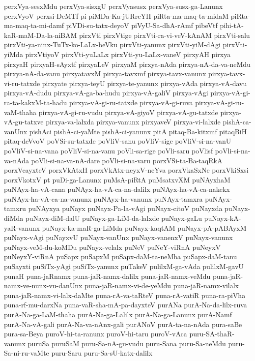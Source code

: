 {perxVya-sesxMdu
perxVya-sisxgU
perxVyasusx
perxVya-susx-ga-Lanunx
perxVyoV
perxsi-DeMTf
pi
piMDa-Ka-jURreYH
piRta-ma-maq-ta-midaM
piRta-ma-maq-ta-mi-damf
piVDi-su-tatx-deyoV
piVyU-Sa-dhA-rAmf
pibeVtf
pihi-tA-kaR-maM-Da-la-niBAM
pirxVti
pirxVtige
pirxVti-ra-vi-veV-kAnAM
pirxVti-salu
pirxVti-ya-ninx-TuTx-ko-LaLx-beVku
pirxVti-yanunx
pirxVti-yiM-dAgi
pirxVti-yiMda
pirxVtiyoV
pirxVti-yuLaLx
pirxVti-yu-LaLx-vaneV
pirxyAH
pirxya
pirxyaH
pirxyaH-sAyxtf
pirxyaLeV
pirxyaM
pirxya-nAda
pirxya-nA-da-va-neMdu
pirxya-nA-da-vanu
pirxyatavxM
pirxya-tavxmf
pirxya-tavx-vanunx
pirxya-tavx-vi-ru-tatxde
pirxyate
pirxya-teyU
pirxya-te-yanunx
pirxya-vAda
pirxya-vA-davu
pirxya-vA-dudu
pirxya-vA-ga-ba-hudu
pirxya-vA-galiV
pirxya-vAgi
pirxya-vA-gi-ra-ta-kakxM-ta-hadu
pirxya-vA-gi-ru-tatxde
pirxya-vA-gi-ruva
pirxya-vA-gi-ru-vaM-thaha
pirxya-vA-gi-ru-vudu
pirxya-vA-giyoV
pirxya-vA-gu-tatxde
pirxya-vA-gu-tatxve
pirxya-va-lalxda
pirxya-vanunx
pirxyaveV
pirxya-vi-lalxde
pishA-ca-vanUnx
pishAci
pishA-ci-yaMte
pishA-ci-yanunx
pitA
pitaq-Ba-kitxmf
pitaqBiH
pitaq-deVvoV
poVSi-su-tatxde
poVliV-sanu
poVliV-sige
poVliV-si-na-vanU
poVliV-si-na-vana
poVliV-si-na-vanu
poVli-sa-rige
poVli-saru
poVlisf
poVli-si-na-va-nAda
poVli-si-na-va-nA-dare
poVli-si-na-varu
porxVSi-ta-Ba-taqRkA
porxVcayxteV
porxVkAtxH
porxVkAtx-neyxV-neYva
porxVkaSxNe
porxVkiSxsi
porxVkotxV
pt
puDi-ga-Lanunx
puMsA-piRtA
puMsatxvXM
puNAyxhaM
puNAyx-ha-vA-cana
puNAyx-ha-vA-ca-na-dalilx
puNAyx-ha-vA-ca-nakekx
puNAyx-ha-vA-ca-na-vanunx
puNAyx-ha-vanunx
puNAyx-tamxra
puNAyx-tamxru
puNAyxya
puNayx
puNayx-Pa-la-vAgi
puNayx-citoV
puNayxda
puNayx-diMda
puNayx-diM-dalU
puNayx-ga-LiM-da-lalxde
puNayx-gaLu
puNayx-kA-yaR-vanunx
puNayx-ka-maR-ga-LiMda
puNayx-kaqtAM
puNayx-pA-pABAyxM
puNayx-vAgi
puNayxvU
puNayx-vanUnx
puNayx-vanenxV
puNayx-vanunx
puNayx-veM-du-koMDu
puNayx-velalx
puNeV
puNeY-viRnA
puNeyxV
puNeyxY-viRnA
puSapx
puSapxM
puSapx-daM-ta-neMba
puSapx-daM-tanu
puSayxti
puSiTx-yAgi
puSiTx-yanunx
puTakeV
pulilxM-ga-vAda
pulilxM-gavU
punaH
puna-jaRnamx
puna-jaR-namx-dalilx
puna-jaR-namx-veMdu
puna-jaR-namx-ve-nunx-vu-danUnx
puna-jaR-namx-vi-de-yeMdu
puna-jaR-namx-vilalx
puna-jaR-namx-vi-lalx-daMte
puna-rA-va-taRteV
puna-rA-vatiR
puna-ra-piVha
puna-rf-mu-darxNa
puna-vaR-sha-mA-pa-dayxteV
purANa
purA-Na-da-lilx-ruva
purA-Na-ga-LaM-thaha
purA-Na-ga-Lalilx
purA-Na-ga-Lanunx
purA-Namf
purA-Na-vA-gali
purA-Na-va-nAnx-gali
purANoV
purA-ta-na-nAda
pura-saBe
pura-sa-Beya
puroV-hi-ta-ranunx
puroV-hi-taru
puroV-vAca
puru-SA-thaR-vanunx
puruSa
puruSaM
puru-Sa-nA-gu-vudu
puru-Sana
puru-Sa-neMdu
puru-Sa-ni-ru-vaMte
puru-Saru
puru-Sa-sU-katx-dalilx
}
